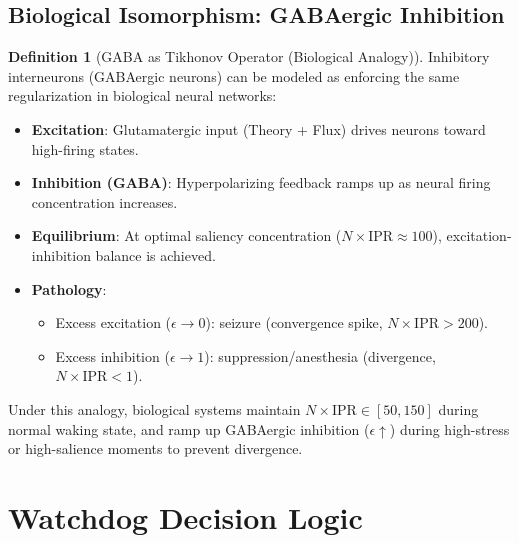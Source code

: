 \documentclass[11pt,oneside]{article}
\theoremstyle{definition}
\newtheorem{definition}[theorem]{Definition}
\begin{document}
\subsection{Biological Isomorphism: GABAergic Inhibition}

\begin{definition}[GABA as Tikhonov Operator (Biological Analogy)]
Inhibitory interneurons (GABAergic neurons) can be modeled as enforcing the same regularization in biological neural networks:

\begin{itemize}
  \item \textbf{Excitation}: Glutamatergic input (Theory + Flux) drives neurons toward high-firing states.
  \item \textbf{Inhibition (GABA)}: Hyperpolarizing feedback ramps up as neural firing concentration increases.
  \item \textbf{Equilibrium}: At optimal saliency concentration ($N \times \text{IPR} \approx 100$), excitation-inhibition balance is achieved.
  \item \textbf{Pathology}:
  \begin{itemize}
    \item Excess excitation ($\epsilon \to 0$): seizure (convergence spike, $N \times \text{IPR} > 200$).
    \item Excess inhibition ($\epsilon \to 1$): suppression/anesthesia (divergence, $N \times \text{IPR} < 1$).
  \end{itemize}
\end{itemize}

Under this analogy, biological systems maintain $N \times \text{IPR} \in [50, 150]$ during normal waking state, and ramp up GABAergic inhibition ($\epsilon \uparrow$) during high-stress or high-salience moments to prevent divergence.
\end{definition}

\section{Watchdog Decision Logic}
\end{document}

